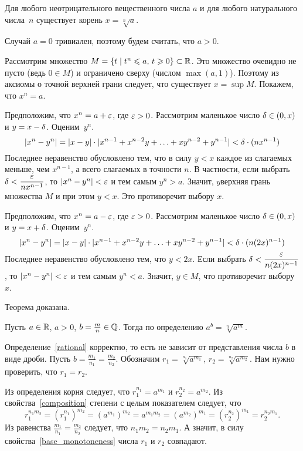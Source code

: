 \documentclass[a4paper,12pt,fleqn]{article}
\begin{document}
Для любого неотрицательного вещественного числа $a$ и для любого натурального числа~$n$ существует корень $x=\sqrt[n]a$.

Случай $a=0$ тривиален, поэтому будем считать, что $a > 0$.

Рассмотрим множество $M = \{t \mid t^n \leqslant a,\, t\geqslant 0\} \subset \mathbb{R}$. Это множество очевидно не пусто (ведь $0 \in M$) и ограничено сверху (числом $\max(a,1)$). Поэтому из аксиомы о точной верхней грани следует, что существует $x = \sup M$. Покажем, что $x^n = a$.

Предположим, что $x^n = a + \varepsilon$, где $\varepsilon > 0$. Рассмотрим маленькое число $\delta \in (0, x)$ и $y = x - \delta$. Оценим~$y^n$.
\[
|x^n - y^n| = |x-y|\cdot|x^{n-1} + x^{n-2}y + \ldots + xy^{n-2} + y^{n-1}| < \delta \cdot (nx^{n-1})
\]
Последнее неравенство обусловлено тем, что в силу $y < x$ каждое из слагаемых меньше, чем $x^{n-1}$, а всего слагаемых в точности $n$.
В частности, если выбрать $\delta < \dfrac{\varepsilon}{nx^{n-1}}$, то $|x^n - y^n| < \varepsilon$ и тем самым $y^n > a$. Значит, $y$\т верхняя грань множества $M$ и при этом $y < x$. Это противоречит выбору $x$.

Предположим, что $x^n = a - \varepsilon$, где $\varepsilon > 0$. Рассмотрим маленькое число $\delta \in (0, x)$ и $y = x + \delta$. Оценим~$y^n$.
\[
|x^n - y^n| = |x-y|\cdot|x^{n-1} + x^{n-2}y + \ldots + xy^{n-2} + y^{n-1}| < \delta \cdot (n(2x)^{n-1})
\]
Последнее неравенство обусловлено тем, что $y < 2x$.
Если выбрать $\delta < \dfrac{\varepsilon}{n(2x)^{n-1}}$, то $|x^n - y^n| < \varepsilon$ и тем самым $y^n < a$. Значит, $y\in M$, что противоречит выбору $x$.

Теорема доказана.

\label{rational}
Пусть $a\in\mathbb{R}$, $a > 0$, $b = \frac{m}{n} \in \mathbb{Q}$. Тогда по определению $a^b = \sqrt[n]{a^m}$.

Определение~\ref{rational} корректно, то есть не зависит от представления числа $b$ в виде дроби.
Пусть $b = \frac{m_1}{n_1} = \frac{m_2}{n_2}$. Обозначим $r_1 = \sqrt[n_1]{a^{m_1}}$, $r_2 = \sqrt[n_2]{a^{m_2}}$. Нам нужно проверить, что $r_1 = r_2$.

Из определения корня следует, что $r_1^{n_1} = a^{m_1}$ и $r_2^{n_2} = a^{m_2}$. Из свойства~\ref{composition} степени с целым показателем следует, что
\[
r_1^{n_1 m_2} = (r_1^{n_1})^{m_2} = (a^{m_1})^{m_2} = a^{m_1 m_2} = (a^{m_2})^{m_1} = (r_2^{n_2})^{m_1} = r_2^{n_2 m_1}.
\]
Из равенства $\frac{m_1}{n_1} = \frac{m_2}{n_2}$ следует, что $n_1 m_2 = n_2 m_1$. А значит, в силу свойства~\ref{base_monotoneness} числа $r_1$ и $r_2$ совпадают.
\end{document}
